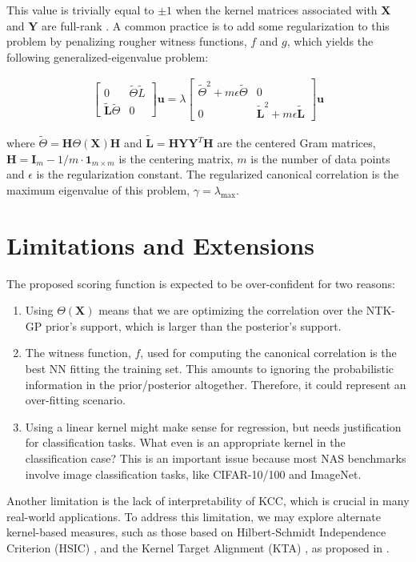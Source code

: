\documentclass[a4paper,12pt]{article}
\begin{document}
This value is trivially equal to $\pm 1$ when the kernel matrices associated with $\mathbf{X}$ and $\mathbf{Y}$ are full-rank \cite{gretton05a}. A common practice is to add some regularization to this problem by penalizing rougher witness functions, $f$ and $g$, which yields the following generalized-eigenvalue problem:

\begin{align}
    \begin{bmatrix}
        0 & \tilde{\Theta}\tilde{L} \\
        \tilde{\mathbf{L}}\tilde{\Theta} & 0
    \end{bmatrix} \mathbf{u} = 
    \lambda
    \begin{bmatrix}
        \tilde{\Theta}^2 + m\epsilon\tilde{\Theta} & 0 \\
        0 & \tilde{\mathbf{L}}^2 + m\epsilon\tilde{\mathbf{L}}
    \end{bmatrix} \mathbf{u}
\end{align}

where $\tilde{\Theta} = \mathbf{H}\Theta\left(\mathbf{X}\right)\mathbf{H}$ and $\tilde{\mathbf{L}} = \mathbf{H}\mathbf{Y}\mathbf{Y}^T\mathbf{H}$ are the centered Gram matrices, $\mathbf{H} = \mathbf{I}_m - 1/m \cdot \mathbf{1}_{m\times m}$ is the centering matrix, $m$ is the number of data points and $\epsilon$ is the regularization constant. The regularized canonical correlation is the maximum eigenvalue of this problem, $\gamma = \lambda_{\text{max}}$.

\section{Limitations and Extensions}

The proposed scoring function is expected to be over-confident for two reasons:
\begin{enumerate}
  \item Using $\Theta\left(\mathbf{X}\right)$ means that we are optimizing the correlation over the NTK-GP prior's support, which is larger than the posterior's support.
  \item The witness function, $f$, used for computing the canonical correlation is the best NN fitting the training set. This amounts to ignoring the probabilistic information in the prior/posterior altogether. Therefore, it could represent an over-fitting scenario.
  \item Using a linear kernel might make sense for regression, but needs justification for classification tasks. What even is an appropriate kernel in the classification case? This is an important issue because most NAS benchmarks involve image classification tasks, like CIFAR-10/100 and ImageNet.
\end{enumerate}

Another limitation is the lack of interpretability of KCC, which is crucial in many real-world applications. To address this limitation, we may explore alternate kernel-based measures, such as those based on Hilbert-Schmidt Independence Criterion (HSIC) \citep{gretton2005hsic}, and the Kernel Target Alignment (KTA) \citep{cortes12kta}, as proposed in \cite{chang13hsic}.

\clearpage


\end{document}
